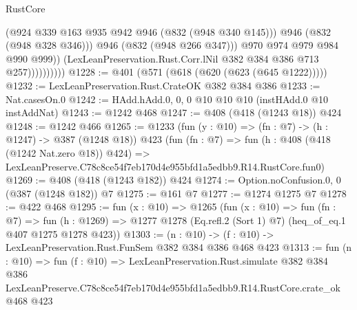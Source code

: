 \begin{lexlean}{RustCore}
\begin{coremodule}
                              (@924 @339 @163 @935 @942 @946 (@832 (@948 @340 @145)))
                              @946
                              (@832 (@948 @328 @346)))
                            @946
                            (@832 (@948 @266 @347)))
                          @970
                          @974
                          @979
                          @984
                          @990
                          @999))
                      (LexLeanPreservation.Rust.Corr.lNil @382 @384 @386 @713 @257))))))))))
@1228 := @401 (@571 (@618 (@620 (@623 (@645 @1222)))))
@1232 := LexLeanPreservation.Rust.CrateOK @382 @384 @386
@1233 := Nat.casesOn.{0}
@1242 := HAdd.hAdd.{0, 0, 0} @10 @10 @10 (instHAdd.{0} @10 instAddNat)
@1243 := @1242 @468
@1247 := @408 (@418 (@1243 @18)) @424
@1248 := @1242 @466
@1265 := @1233
    (fun (y : @10) => (fn : @7) -> (h : @1247) -> @387 (@1248 @18))
    @423
    (fun (fn : @7) =>
    fun (h : @408 (@418 (@1242 Nat.zero @18)) @424) =>
    LexLeanPreserve.C78c8ce54f7eb170d4e955bfd1a5edbb9.R14.RustCore.fun0)
@1269 := @408 (@418 (@1243 @182)) @424
@1274 := Option.noConfusion.{0, 0} (@387 (@1248 @182)) @7
@1275 := @161 @7
@1277 := @1274 @1275 @7
@1278 := @422 @468
@1295 := fun (x : @10) =>
  @1265
    (fun (x : @10) =>
    fun (fn : @7) =>
    fun (h : @1269) => @1277 @1278 (Eq.refl.{2} (Sort 1) @7) (heq_of_eq.{1} @407 @1275 @1278 @423))
@1303 := (n : @10) -> (f : @10) -> LexLeanPreservation.Rust.FunSem @382 @384 @386 @468 @423
@1313 := fun (n : @10) =>
  fun (f : @10) =>
  LexLeanPreservation.Rust.simulate
    @382
    @384
    @386
    LexLeanPreserve.C78c8ce54f7eb170d4e955bfd1a5edbb9.R14.RustCore.crate_ok
    @468
    @423
\end{coremodule}
\end{lexlean}
